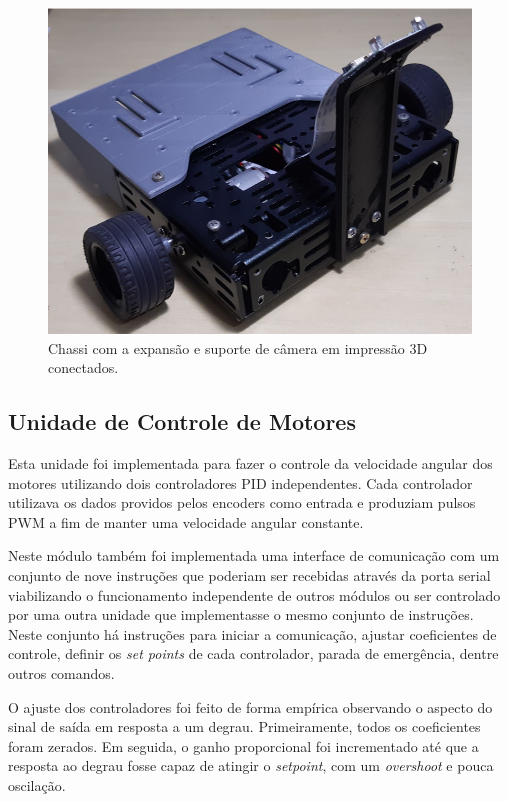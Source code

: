 \documentclass[a4paper]{ifacconf}
\begin{document}
\begin{figure}
\begin{center}
\includegraphics[scale=0.3]{Figuras/robot.png}
\caption{Chassi com a expansão e suporte de câmera em impressão 3D conectados.}
\label{fig:markov_proc}
\end{center}
\end{figure}

\subsection{Unidade de Controle de Motores}
Esta unidade foi implementada para fazer o controle da velocidade angular dos motores utilizando dois controladores PID independentes. Cada controlador utilizava os dados providos pelos encoders como entrada e produziam pulsos PWM a fim de manter uma velocidade angular constante. 

Neste módulo também foi implementada uma interface de comunicação com um  conjunto de nove instruções que poderiam ser recebidas através da porta serial viabilizando o funcionamento independente de outros módulos ou ser controlado por uma outra unidade que implementasse o mesmo conjunto de instruções. Neste conjunto há instruções para iniciar a comunicação, ajustar coeficientes de controle, definir os \emph{set points} de cada controlador, parada de emergência, dentre outros comandos.

O ajuste dos controladores foi feito de forma empírica observando o aspecto do sinal de saída em resposta a um degrau. Primeiramente, todos os coeficientes foram zerados. Em seguida, o ganho proporcional foi incrementado até que a resposta ao degrau fosse capaz de atingir o \textit{setpoint}, com um \textit{overshoot} e pouca oscilação. 
\end{document}
